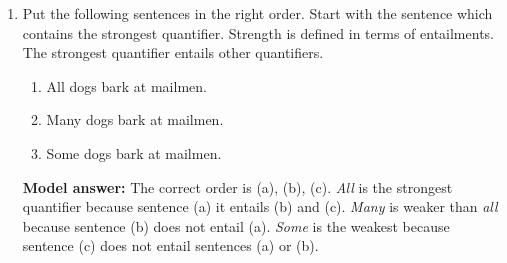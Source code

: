 \documentclass[a4,11pt]{article}
\newcommand{\6}{\mbox{$[\hspace*{-.6mm}[$}}
\newcommand{\9}{\mbox{$]\hspace*{-.6mm}]$}}
\begin{document}
\begin{enumerate}[leftmargin = 12pt]
\begin{enumerate}
\item The inference arises because of Modus Tollens which allows us to make inferences of the following form {\it If p, then q. Not q. Therefore not p}. Substituting p with \textit{you’re hungry} and q with \textit{there’s some pizza in the fridge}, we derive the inference that {\it If there’s no pizza in the fridge, then you’re not hungry.}
\item The inference arises because of Modus Tollens which allows us to make inferences of the following form {\it If p, then q. Not q. Therefore not p}. Substituting q with \textit{you’re hungry} and p with \textit{there’s some pizza in the fridge}, we derive the inference that {\it If there’s no pizza in the fridge, then you’re not hungry.}
\item The inference arises because of Modus Ponens which allows us to make the following inference {\it If p, then q. p. Therefore q.} Substituting p with \textit{you’re hungry} and q with \textit{there’s some pizza in the fridge}, we derive the inference that {\it If there’s no pizza in the fridge, then you’re not hungry.}
\item The inference arises because of Modus Ponens which allows us to make the following inference {\it If p, then q. p. Therefore q.} Substituting q with \textit{you’re hungry} and p with \textit{there’s some pizza in the fridge}, we derive the inference that {\it If there’s no pizza in the fridge, then you’re not hungry.}
\end{enumerate}

{ \bf Model answer:} The correct answer is (a).

\item Put the following sentences in the right order. Start with the sentence which contains the strongest quantifier. Strength is defined in terms of entailments. The strongest quantifier entails other quantifiers.

\begin{enumerate}[noitemsep]
\item All dogs bark at mailmen.
\item Many dogs bark at mailmen.
\item Some dogs bark at mailmen.
\end{enumerate}

{ \bf Model answer:} The correct order is (a), (b), (c). \textit{All} is the strongest quantifier because sentence (a) it entails (b) and (c). \textit{Many} is weaker than \textit{all} because sentence (b) does not entail (a). \textit{Some} is the weakest because sentence (c) does not entail sentences (a) or (b).


\end{enumerate}
\end{document}
